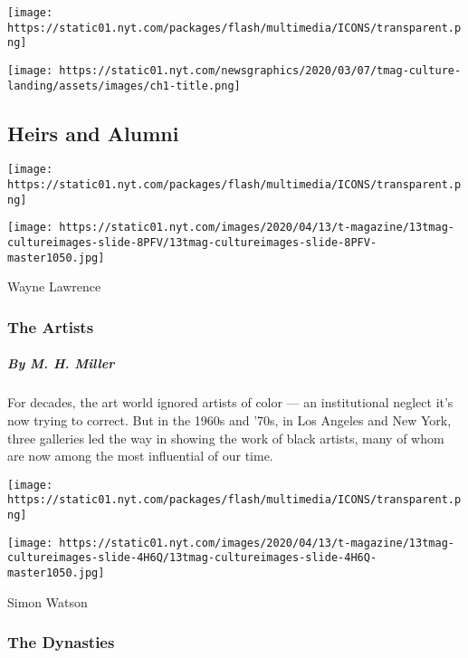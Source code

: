 \texttt{[image: https://static01.nyt.com/packages/flash/multimedia/ICONS/transparent.png]}

\texttt{[image: https://static01.nyt.com/newsgraphics/2020/03/07/tmag-culture-landing/assets/images/ch1-title.png]}

\hypertarget{heirs-and-alumni}{%
\subsection{Heirs and Alumni}\label{heirs-and-alumni}}

\href{https://www.nytimes.com/interactive/2020/04/13/t-magazine/black-art-galleries.html}{}

\texttt{[image: https://static01.nyt.com/packages/flash/multimedia/ICONS/transparent.png]}

\texttt{[image: https://static01.nyt.com/images/2020/04/13/t-magazine/13tmag-cultureimages-slide-8PFV/13tmag-cultureimages-slide-8PFV-master1050.jpg]}

Wayne Lawrence

\hypertarget{the-artists}{%
\subsubsection{The Artists}\label{the-artists}}

\hypertarget{by-m-h-miller}{%
\subparagraph{By M. H. Miller}\label{by-m-h-miller}}

For decades, the art world ignored artists of color --- an institutional
neglect it's now trying to correct. But in the 1960s and '70s, in Los
Angeles and New York, three galleries led the way in showing the work of
black artists, many of whom are now among the most influential of our
time.

\href{https://www.nytimes.com/interactive/2020/04/13/t-magazine/italian-fashion-design-houses.html}{}

\texttt{[image: https://static01.nyt.com/packages/flash/multimedia/ICONS/transparent.png]}

\texttt{[image: https://static01.nyt.com/images/2020/04/13/t-magazine/13tmag-cultureimages-slide-4H6Q/13tmag-cultureimages-slide-4H6Q-master1050.jpg]}

Simon Watson

\hypertarget{the-dynasties}{%
\subsubsection{The Dynasties}\label{the-dynasties}}

